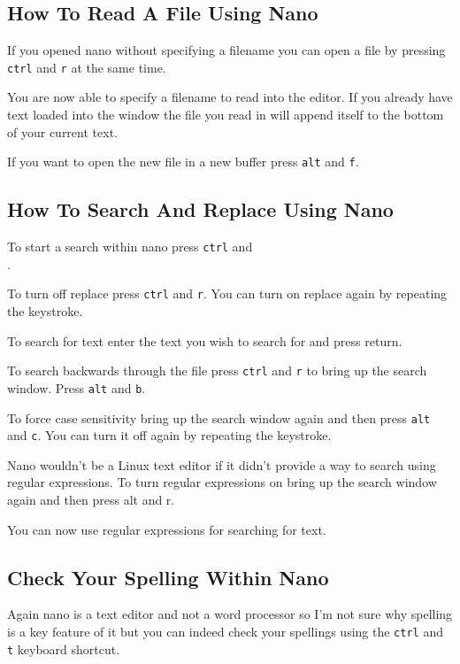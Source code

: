 \subsection{How To Read A File Using Nano}
If you opened nano without specifying a filename you can open a file by pressing \texttt{ctrl}  and
\texttt{r} at the same time.

You are now able to specify a filename to read into the editor. If you already have text loaded into
the window the file you read in will append itself to the bottom of your current text.

If you want to open the new file in a new buffer press \texttt{alt} and \texttt{f}.

\subsection{How To Search And Replace Using Nano}
To start a search within nano press \texttt{ctrl}  and \texttt{\\}. 

To turn off replace press \texttt{ctrl}  and \texttt{r}. You can turn on replace again by repeating
the keystroke.

To search for text enter the text you wish to search for and press return.

To search backwards through the file press \texttt{ctrl}  and \texttt{r} to bring up the search
window. Press \texttt{alt} and \texttt{b}.

To force case sensitivity bring up the search window again and then press \texttt{alt} and
\texttt{c}. You can turn it off again by repeating the keystroke.

Nano wouldn't be a Linux text editor if it didn't provide a way to search using regular expressions.
To turn regular expressions on bring up the search window again and then press alt and r.

You can now use regular expressions for searching for text.

\subsection{Check Your Spelling Within Nano}
Again nano is a text editor and not a word processor so I'm not sure why spelling is a key feature
of it but you can indeed check your spellings using the \texttt{ctrl}  and \texttt{t} keyboard shortcut.

